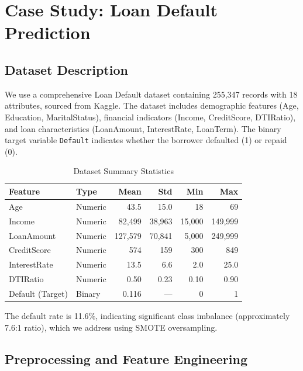 \documentclass[runningheads]{llncs}
\begin{document}

\section{Case Study: Loan Default Prediction}
\label{sec:casestudy}

\subsection{Dataset Description}

We use a comprehensive Loan Default dataset containing 255,347 records with 18 attributes, sourced from Kaggle. The dataset includes demographic features (Age, Education, MaritalStatus), financial indicators (Income, CreditScore, DTIRatio), and loan characteristics (LoanAmount, InterestRate, LoanTerm). The binary target variable \texttt{Default} indicates whether the borrower defaulted (1) or repaid (0).

\begin{table}[H]
\centering
\caption{Dataset Summary Statistics}
\label{tab:dataset}
\begin{tabular}{@{}llrrrr@{}}
\toprule
Feature & Type & Mean & Std & Min & Max \\
\midrule
Age & Numeric & 43.5 & 15.0 & 18 & 69 \\
Income & Numeric & 82,499 & 38,963 & 15,000 & 149,999 \\
LoanAmount & Numeric & 127,579 & 70,841 & 5,000 & 249,999 \\
CreditScore & Numeric & 574 & 159 & 300 & 849 \\
InterestRate & Numeric & 13.5 & 6.6 & 2.0 & 25.0 \\
DTIRatio & Numeric & 0.50 & 0.23 & 0.10 & 0.90 \\
Default (Target) & Binary & 0.116 & --- & 0 & 1 \\
\bottomrule
\end{tabular}
\end{table}

The default rate is 11.6\%, indicating significant class imbalance (approximately 7.6:1 ratio), which we address using SMOTE oversampling.

\subsection{Preprocessing and Feature Engineering}
\end{document}
